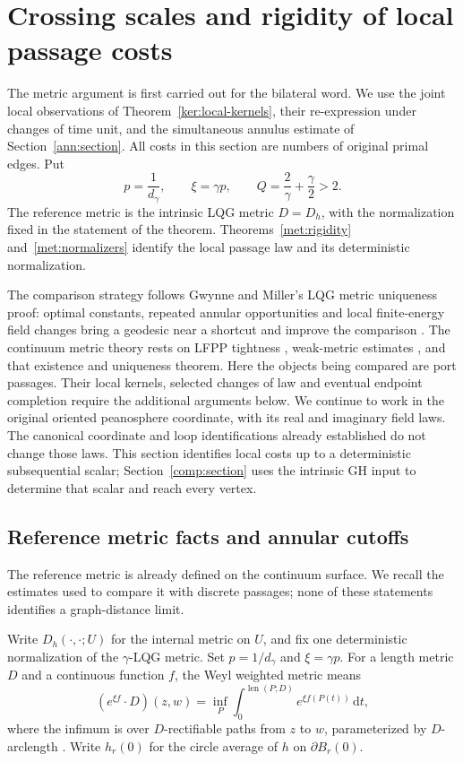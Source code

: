 \documentclass[11pt]{article}
\numberwithin{equation}{section}
\theoremstyle{definition}
\theoremstyle{remark}
\newcommand{\1}{\mathbf 1}
\begin{document}
\section{Crossing scales and rigidity of local passage costs}
\label{met:section}

The metric argument is first carried out for the bilateral word.  We use
the joint local observations of Theorem~\ref{ker:local-kernels}, their
re-expression under changes of time unit, and the simultaneous annulus
estimate of Section~\ref{ann:section}.  All costs in this section are
numbers of original primal edges.  Put
\[
 p=\frac1{d_\gamma},\qquad \xi=\gamma p,\qquad
 Q=\frac2\gamma+\frac\gamma2>2.
\]
The reference metric is the intrinsic LQG metric $D=D_h$, with the
normalization fixed in the statement of the theorem.
Theorems~\ref{met:rigidity} and~\ref{met:normalizers} identify the local
passage law and its deterministic normalization.

The comparison strategy follows Gwynne and Miller's LQG metric uniqueness
proof: optimal constants, repeated annular opportunities and local
finite-energy field changes bring a geodesic near a shortcut and improve
the comparison
\cite[Section~1.5 and Sections~3--6]{GwynneMillerMetric}. The continuum
metric theory rests on LFPP tightness
\cite{DingDubedatDunlapFalconetTightness}, weak-metric estimates
\cite{DubedatEtAlWeakMetric}, and that existence and uniqueness theorem.
Here the objects being compared are port passages. Their local kernels,
selected changes of law and eventual endpoint completion require the
additional arguments below.  We continue to work in the original
oriented peanosphere coordinate, with its real and imaginary field
laws.  The canonical coordinate and loop identifications already
established do not change those laws.  This section identifies local
costs up to a deterministic subsequential scalar; Section~\ref{comp:section}
uses the intrinsic GH input to determine that scalar and reach every
vertex.

\subsection{Reference metric facts and annular cutoffs}

The reference metric is already defined on the continuum surface.  We
recall the estimates used to compare it with discrete passages; none
of these statements identifies a graph-distance limit.


Write $D_h(\cdot,\cdot;U)$ for the internal metric on $U$, and fix one
deterministic normalization of the $\gamma$-LQG metric.  Set
$p=1/d_\gamma$ and $\xi=\gamma p$. For a length metric $D$ and a
continuous function $f$, the Weyl weighted metric means
\[
 (e^{\xi f}\!\cdot D)(z,w)
 =\inf_P\int_0^{\operatorname{len}(P;D)}e^{\xi f(P(t))}\,\mathrm d t,
\]
where the infimum is over $D$-rectifiable paths from $z$ to $w$,
parameterized by $D$-arclength \citep{GwynneMillerMetric}.
Write $h_r(0)$ for the circle average of $h$ on $\partial B_r(0)$.
\end{document}
